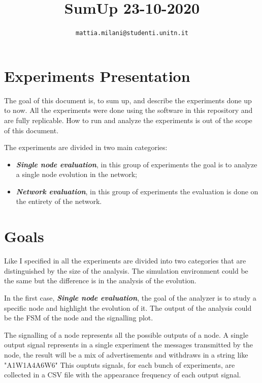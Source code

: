 \documentclass[10pt,conference,letterpaper]{IEEEtran}
\begin{document}
\title{SumUp 23-10-2020}
\author{
    \texttt{mattia.milani@studenti.unitn.it}
}


\maketitle

\section{Experiments Presentation}
\label{sec:mainIdea}

The goal of this document is, to sum up, and describe the experiments done up to 
now.
All the experiments were done using the software in this repository and are
fully replicable.
How to run and analyze the experiments is out of the scope of this document.

The experiments are divided in two main categories:
\begin{itemize}
	\item \textit{\textbf{Single node evaluation}}, in this group of experiments
		the goal is to analyze a single node evolution in the network;
	\item \textit{\textbf{Network evaluation}}, in this group of experiments 
		the evaluation is done on the entirety of the network.
\end{itemize}

\section{Goals}
\label{sec:goals}

Like I specified in  all the experiments are divided into two
categories that are distinguished by the size of the analysis.
The simulation environment could be the same but the difference is in the
analysis of the evolution.

In the first case, \textit{\textbf{Single node evaluation}}, the goal of the
analyzer is to study a specific node and highlight the evolution of it.
The output of the analysis could be the \ac{FSM} of the node and the signalling
plot.

The signalling of a node represents all the possible outputs of a node.
A single output signal represents in a single experiment the messages transmitted
by the node, the result will be a mix of advertisements and withdraws in
a string like "A1W1A4A6W6"
This ouptuts signals, for each bunch of experiments, are collected in a CSV file
with the appearance frequency of each output signal.
\end{document}
